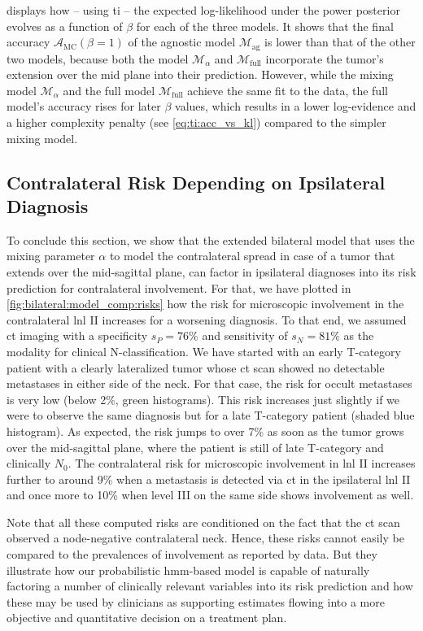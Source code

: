 \documentclass[\relativeRoot/main.tex]{subfiles}
\begin{document}
 displays how -- using \gls{ti} -- the expected log-likelihood under the power posterior evolves as a function of $\beta$ for each of the three models. It shows that the final accuracy $\mathcal{A}_\text{MC}(\beta=1)$ of the agnostic model $\mathcal{M}_\text{ag}$ is lower than that of the other two models, because both the model $\mathcal{M}_\alpha$ and $\mathcal{M}_\text{full}$ incorporate the tumor's extension over the mid plane into their prediction. However, while the mixing model $\mathcal{M}_\alpha$ and the full model $\mathcal{M}_\text{full}$ achieve the same fit to the data, the full model's accuracy rises for later $\beta$ values, which results in a lower log-evidence and a higher complexity penalty (see \cref{eq:ti:acc_vs_kl}) compared to the simpler mixing model.

\subsection{Contralateral Risk Depending on Ipsilateral Diagnosis}
\label{subsec:bilateral:model_comp:risk}

To conclude this section, we show that the extended bilateral model that uses the mixing parameter $\alpha$ to model the contralateral spread in case of a tumor that extends over the mid-sagittal plane, can factor in ipsilateral diagnoses into its risk prediction for contralateral involvement. For that, we have plotted in \cref{fig:bilateral:model_comp:risks} how the risk for microscopic involvement in the contralateral \gls{lnl} II increases for a worsening diagnosis. To that end, we assumed \gls{ct} imaging with a specificity $s_P = 76\%$ and sensitivity of $s_N = 81\%$ as the modality for clinical N-classification. We have started with an early T-category patient with a clearly lateralized tumor whose \gls{ct} scan showed no detectable metastases in either side of the neck. For that case, the risk for occult metastases is very low (below 2\%, green histograms). This risk increases just slightly if we were to observe the same diagnosis but for a late T-category patient (shaded blue histogram). As expected, the risk jumps to over 7\% as soon as the tumor grows over the mid-sagittal plane, where the patient is still of late T-category and clinically $N_0$. The contralateral risk for microscopic involvement in \gls{lnl} II increases further to around 9\% when a metastasis is detected via \gls{ct} in the ipsilateral \gls{lnl} II and once more to 10\% when level III on the same side shows involvement as well.

Note that all these computed risks are conditioned on the fact that the \gls{ct} scan observed a node-negative contralateral neck. Hence, these risks cannot easily be compared to the prevalences of involvement as reported by data. But they illustrate how our probabilistic \acrshort{hmm}-based model is capable of naturally factoring a number of clinically relevant variables into its risk prediction and how these may be used by clinicians as supporting estimates flowing into a more objective and quantitative decision on a treatment plan.
\end{document}
